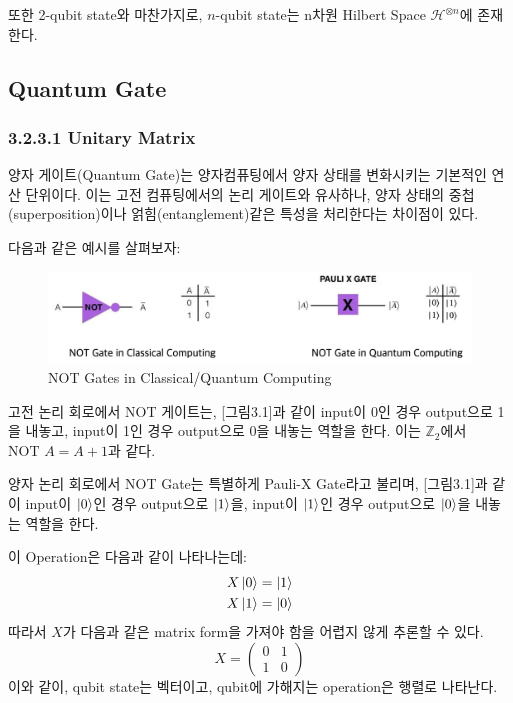 \noindent 또한 2-qubit state와 마찬가지로, \(n\)-qubit state는 n차원 Hilbert Space \(\mathcal{H}^{\otimes n}\)에 존재한다.

\subsection{Quantum Gate}
\subsubsection{3.2.3.1 \quad Unitary Matrix}
양자 게이트(Quantum Gate)는 양자컴퓨팅에서 양자 상태를 변화시키는 기본적인 연산 단위이다. 이는 고전 컴퓨팅에서의 논리 게이트와 유사하나, 양자 상태의 중첩(superposition)이나 얽힘(entanglement)같은 특성을 처리한다는 차이점이 있다.

\noindent 다음과 같은 예시를 살펴보자:

\begin{figure}[htb!]
    \centering
    \includegraphics[width=0.8\linewidth]{figs/Not Gates.png}
    \caption{NOT Gates in Classical/Quantum Computing}
    \label{fig:NOT-Gates}
\end{figure}

고전 논리 회로에서 NOT 게이트는, [그림3.1]과 같이 input이 0인 경우 output으로 1을 내놓고, input이 1인 경우 output으로 0을 내놓는 역할을 한다. 이는 \(\mathbb{Z}_2\)에서 \( \text{NOT } A = A + 1\)과 같다.

양자 논리 회로에서 NOT Gate는 특별하게 Pauli-X Gate라고 불리며, [그림3.1]과 같이 input이 \(\ket 0\)인 경우 output으로 \(\ket 1\)을, input이 \(\ket 1\)인 경우 output으로 \(\ket 0\)을 내놓는 역할을 한다.

이 Operation은 다음과 같이 나타나는데:
\begin{align*}
    X\ket{0} &= \ket{1}  \\
    X\ket{1} &= \ket{0}
\end{align*}
따라서 \(X\)가 다음과 같은 matrix form을 가져야 함을 어렵지 않게 추론할 수 있다.
\[
    X = \begin{pmatrix}
        0 & 1 \\
        1 & 0
    \end{pmatrix}
\]
이와 같이, qubit state는 벡터이고, qubit에 가해지는 operation은 행렬로 나타난다.

